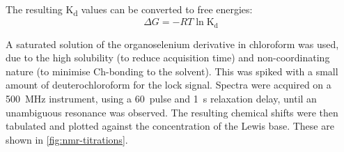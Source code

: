 The resulting K\textsubscript{d} values can be converted to free energies:
\begin{equation}
    \Delta G = -RT \ln{\mathrm{K_d}}
\end{equation}

A saturated solution of the organoselenium derivative in chloroform was used, due to the high solubility (to reduce acquisition time) and non-coordinating nature (to minimise Ch-bonding to the solvent).
This was spiked with a small amount of deuterochloroform for the lock signal.
Spectra were acquired on a 500~MHz instrument, using a 60\degree~pulse and 1~s relaxation delay, until an unambiguous  resonance was observed.
The resulting chemical shifts were then tabulated and plotted against the concentration of the Lewis base.
These are shown in \ref{fig:nmr-titrations}.


